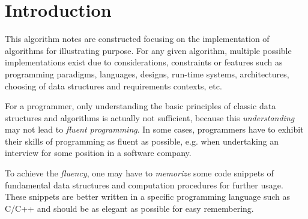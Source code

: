 \chapter{Introduction}

This algorithm notes are constructed focusing on the implementation of algorithms for illustrating purpose.
For any given algorithm, multiple possible implementations exist due to considerations, constraints or features
such as programming paradigms, languages, designs, run-time systems, architectures, choosing of data structures and requirements contexts, etc.

For a programmer, only understanding the basic principles of classic data structures and algorithms is actually not sufficient,
because this \emph{understanding} may not lead to \emph{fluent programming}.
In some cases, programmers have to exhibit their skills of programming as fluent as possible, e.g. when undertaking an interview for some position in a software company.

To achieve the \emph{fluency},
one may have to \emph{memorize} some code snippets of fundamental data structures and computation procedures for further usage.
These snippets are better written in a specific programming language such as C/C++ and should be as elegant as possible for easy remembering.

